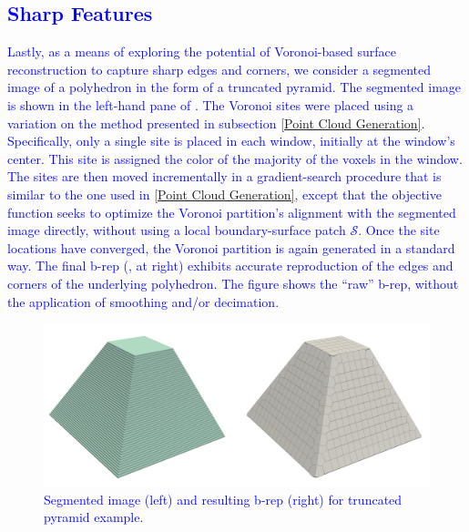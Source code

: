 \subsection{\textcolor{blue}{Sharp Features}}
\label{Sharp Features}

\textcolor{blue}{Lastly, as a means of exploring the potential of Voronoi-based surface reconstruction to capture sharp edges and corners, we consider a segmented image of a polyhedron in the form of a truncated pyramid.  The segmented image is shown in the left-hand pane of  .  The Voronoi sites were placed using a variation on the method presented in subsection \ref{Point Cloud Generation}.  Specifically, only a single site is placed in each window, initially at the window's center.  This site is assigned the color of the majority of the voxels in the window.  The sites are then moved incrementally in a gradient-search procedure that is similar to the one used in \ref{Point Cloud Generation}, except that the objective function seeks to optimize the Voronoi partition's alignment with the segmented image directly, without using a local boundary-surface patch $\mathcal{S}$.  Once the site locations have converged, the Voronoi partition is again generated in a standard way.  The final b-rep (, at right) exhibits accurate reproduction of the edges and corners of the underlying polyhedron.  The figure shows the ``raw'' b-rep, without the application of smoothing and/or decimation.}
\begin{figure}[h!]
	\centering
	\includegraphics[scale=0.10]{media/7-performance/pyramid.pdf}
	\caption{\textcolor{blue}{Segmented image (left) and resulting b-rep (right) for truncated pyramid example.}}
	\label{fig:pyramid}
\end{figure}
